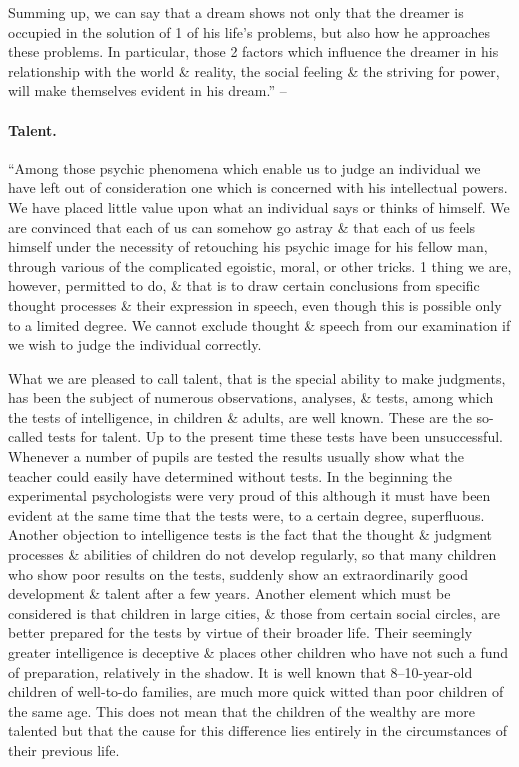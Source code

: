 \documentclass{article}
\begin{document}
Summing up, we can say that a dream shows not only that the dreamer is occupied in the solution of 1 of his life's problems, but also how he approaches these problems. In particular, those 2 factors which influence the dreamer in his relationship with the world \& reality, the social feeling \& the striving for power, will make themselves evident in his dream.'' -- \cite[pp. 107--117]{Adler_human_nature}

\paragraph{Talent.} ``Among those psychic phenomena which enable us to judge an individual we have left out of consideration one which is concerned with his intellectual powers. We have placed little value upon what an individual says or thinks of himself. We are convinced that each of us can somehow go astray \& that each of us feels himself under the necessity of retouching his psychic image for his fellow man, through various of the complicated egoistic, moral, or other tricks. 1 thing we are, however, permitted to do, \& that is to draw certain conclusions from specific thought processes \& their expression in speech, even though this is possible only to a limited degree. We cannot exclude thought \& speech from our examination if we wish to judge the individual correctly.

What we are pleased to call talent, that is the special ability to make judgments, has been the subject of numerous observations, analyses, \& tests, among which the tests of intelligence, in children \& adults, are well known. These are the so-called tests for talent. Up to the present time these tests have been unsuccessful. Whenever a number of pupils are tested the results usually show what the teacher could easily have determined without tests. In the beginning the experimental psychologists were very proud of this although it must have been evident at the same time that the tests were, to a certain degree, superfluous. Another objection to intelligence tests is the fact that the thought \& judgment processes \& abilities of children do not develop regularly, so that many children who show poor results on the tests, suddenly show an extraordinarily good development \& talent after a few years. Another element which must be considered is that children in large cities, \& those from certain social circles, are better prepared for the tests by virtue of their broader life. Their seemingly greater intelligence is deceptive \& places other children who have not such a fund of preparation, relatively in the shadow. It is well known that 8--10-year-old children of well-to-do families, are much more quick witted than poor children of the same age. This does not mean that the children of the wealthy are more talented but that the cause for this difference lies entirely in the circumstances of their previous life.
\end{document}
